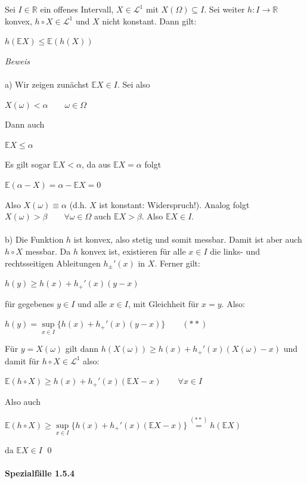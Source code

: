 \documentclass[10pt,a4paper]{report}
\numberwithin{equation}{section}
\numberwithin{figure}{section}
\theoremstyle{plain}
\theoremstyle{definition}
\theoremstyle{plain}
\theoremstyle{definition}
\theoremstyle{remark}
\theoremstyle{plain}
\begin{document}
Sei $I\in \mathbb{R}$ ein offenes Intervall, $X \in \mathcal{L}^1$ mit $X(\Omega)\subseteq I$. Sei weiter $h:I\to\mathbb{R}$ konvex, $h\circ X \in \mathcal{L}^1$ und $X$ nicht konstant. Dann gilt:
\begin{center}
$h(\mathbb{E}X)\leq \mathbb{E}(h(X))$
\end{center}
\textit{Beweis}\\\\
a) Wir zeigen zunächst $\mathbb{E}X \in I$. Sei also
\begin{center}
$X(\omega)< \alpha \qquad \omega \in \Omega$
\end{center}
Dann auch
\begin{center}
$\mathbb{E}X\leq \alpha$
\end{center}
Es gilt sogar $\mathbb{E}X < \alpha$, da aus $\mathbb{E}X=\alpha$ folgt 
\begin{center}
$\mathbb{E}(\alpha-X)=\alpha-\mathbb{E}X=0$
\end{center}
Also $X(\omega)\equiv \alpha$ (d.h. $X$ ist konstant: Widerspruch!). Analog folgt $X(\omega)>\beta \qquad \forall \omega \in \Omega$ auch $\mathbb{E}X> \beta$. Also $\mathbb{E}X \in I$.\\\\
b) Die Funktion $h$ ist konvex, also stetig und somit messbar. Damit ist aber auch $h\circ X$ messbar. Da $h$ konvex ist, existieren für alle $x \in I$ die links- und rechtsseitigen Ableitungen $h_\pm'(x)$ in $X$. Ferner gilt:
\begin{center}
$h(y)\geq h(x)+h_+'(x)(y-x)$
\end{center}
für gegebenes $y \in I$ und alle $x \in I$, mit Gleichheit für $x=y$. Also:
\begin{center}
$h(y)=\sup\limits_{x \in I}\{h(x)+h_+'(x)(y-x)\} \qquad (**)$
\end{center} 
Für $y=X(\omega)$ gilt dann $h(X(\omega))\geq h(x)+h_+'(x)(X(\omega)-x)$ und damit für $h\circ X \in \mathcal{L}^1$ also:\\
\begin{center}
$\mathbb{E}(h\circ X) \geq h(x)+h_+'(x)(\mathbb{E}X-x) \qquad \forall x \in I$
\end{center}
Also auch
\begin{center}
$\mathbb{E}(h\circ X)\geq \sup\limits_{x \in I}\{h(x)+h_+'(x)(\mathbb{E}X-x)\}\overset{(**)}{=}h(\mathbb{E}X)$
\end{center}
da $\mathbb{E}X\in I$ \qed\\\\
\textbf{Spezialfälle 1.5.4}\\\\
\end{document}

